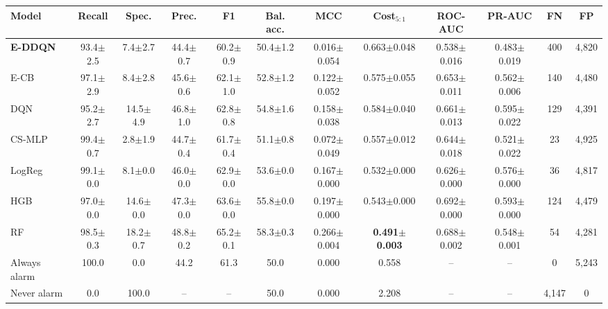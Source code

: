 \begin{tabular}{lccccccccccc}
\toprule
Model & Recall & Spec. & Prec. & F1 & Bal. acc. & MCC & Cost$_{5:1}$ & ROC-AUC & PR-AUC & FN & FP \\
\midrule
\textbf{E-DDQN} & 93.4$\pm$2.5 & 7.4$\pm$2.7 & 44.4$\pm$0.7 & 60.2$\pm$0.9 & 50.4$\pm$1.2 & 0.016$\pm$0.054 & 0.663$\pm$0.048 & 0.538$\pm$0.016 & 0.483$\pm$0.019 & 400 & 4,820 \\
E-CB & 97.1$\pm$2.9 & 8.4$\pm$2.8 & 45.6$\pm$0.6 & 62.1$\pm$1.0 & 52.8$\pm$1.2 & 0.122$\pm$0.052 & 0.575$\pm$0.055 & 0.653$\pm$0.011 & 0.562$\pm$0.006 & 140 & 4,480 \\
DQN & 95.2$\pm$2.7 & 14.5$\pm$4.9 & 46.8$\pm$1.0 & 62.8$\pm$0.8 & 54.8$\pm$1.6 & 0.158$\pm$0.038 & 0.584$\pm$0.040 & 0.661$\pm$0.013 & 0.595$\pm$0.022 & 129 & 4,391 \\
CS-MLP & 99.4$\pm$0.7 & 2.8$\pm$1.9 & 44.7$\pm$0.4 & 61.7$\pm$0.4 & 51.1$\pm$0.8 & 0.072$\pm$0.049 & 0.557$\pm$0.012 & 0.644$\pm$0.018 & 0.521$\pm$0.022 & 23 & 4,925 \\
LogReg & 99.1$\pm$0.0 & 8.1$\pm$0.0 & 46.0$\pm$0.0 & 62.9$\pm$0.0 & 53.6$\pm$0.0 & 0.167$\pm$0.000 & 0.532$\pm$0.000 & 0.626$\pm$0.000 & 0.576$\pm$0.000 & 36 & 4,817 \\
HGB & 97.0$\pm$0.0 & 14.6$\pm$0.0 & 47.3$\pm$0.0 & 63.6$\pm$0.0 & 55.8$\pm$0.0 & 0.197$\pm$0.000 & 0.543$\pm$0.000 & 0.692$\pm$0.000 & 0.593$\pm$0.000 & 124 & 4,479 \\
RF & 98.5$\pm$0.3 & 18.2$\pm$0.7 & 48.8$\pm$0.2 & 65.2$\pm$0.1 & 58.3$\pm$0.3 & 0.266$\pm$0.004 & \textbf{0.491$\pm$0.003} & 0.688$\pm$0.002 & 0.548$\pm$0.001 & 54 & 4,281 \\
\midrule
Always alarm & 100.0 & 0.0 & 44.2 & 61.3 & 50.0 & 0.000 & 0.558 & -- & -- & 0 & 5,243 \\
Never alarm & 0.0 & 100.0 & -- & -- & 50.0 & 0.000 & 2.208 & -- & -- & 4,147 & 0 \\
\bottomrule
\end{tabular}
